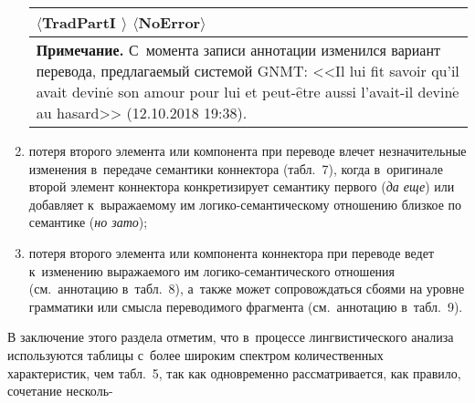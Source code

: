 \begin{multicols}{2}
\begin{enumerate}[(1)]
\begin{table*}
\begin{center}
\begin{tabular}{|p{50.2mm}|p{31mm}|p{42mm}|p{26mm}|}
$\langle$TradPartI $\rangle$\newline
$\langle$NoError$\rangle$\\
\hline
\multicolumn{4}{p{160mm}}{\footnotesize \hspace*{2mm}\textbf{Примечание.} С~момента записи 
аннотации изменился вариант перевода, предлагаемый системой GNMT: <<Il lui fit savoir qu'il avait 
devin$\acute{\mbox{e}}$ son amour pour lui et peut-$\hat{\mbox{e}}$tre aussi l'avait-il devin$\acute{\mbox{e}}$ au 
hasard>> (12.10.2018 19:38).}
\end{tabular}
\end{center}
\end{table*}

    
\item потеря второго элемента или компонента при переводе влечет 
незначительные изменения в~передаче семантики коннектора (табл.~7), 
когда в~оригинале второй элемент коннектора конкретизирует семантику 
первого (\textit{да еще}) или добавляет к~выражаемому им 
логико-семантическому отношению близкое по семантике (\textit{но зато});


\item потеря второго элемента или компонента коннектора при переводе ведет 
к~изменению вы\-ра\-жа\-емо\-го им ло\-ги\-ко-се\-ман\-ти\-че\-ско\-го отношения (см.\ 
аннотацию в~табл.~8), а~также может сопровождаться сбоями на уровне 
грамматики или смысла переводимого фрагмента (см.\ аннотацию в~табл.~9).
\end{enumerate}




  
  В заключение этого раздела отметим, что в~процессе лингвистического 
анализа используются таб\-ли\-цы с~более широким спектром количественных 
характеристик, чем табл.~5, так как одновременно рассматривается, как 
правило, сочетание несколь-\linebreak\vspace*{-12pt}

\pagebreak

\end{multicols}

